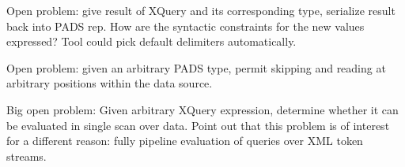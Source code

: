 \documentclass[nocopyrightspace]{sigplanconf}
\begin{document}
Open problem: give result of XQuery and its corresponding type,
serialize result back into PADS rep.  How are the syntactic
constraints for the new values expressed?  Tool could pick default
delimiters automatically. 

Open problem: given an arbitrary PADS type, permit skipping and
reading at arbitrary positions within the data source. 

Big open problem: Given arbitrary XQuery expression, determine whether
it can be evaluated in single scan over data.  Point out that this
problem is of interest for a different reason: fully pipeline
evaluation of queries over XML token streams.


\small
 
\end{document}
